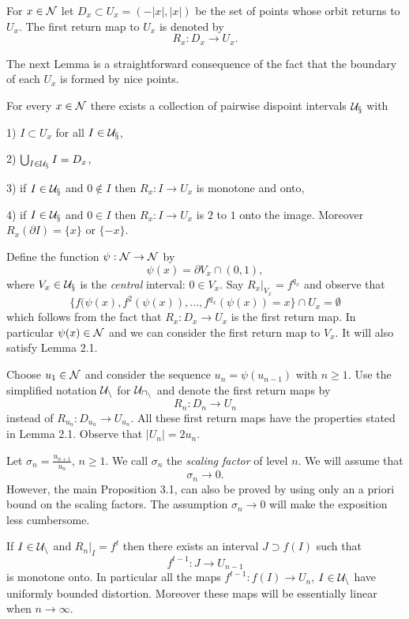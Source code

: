 \flushpar
For $x\in \Cal{N}$ let $D_x\subset U_x=(-|x|,|x|)$ 
be the set of points whose orbit returns to $U_x$. The first return map to 
$U_x$ is denoted by 
$$
R_x:D_x\to U_x.
$$

\flushpar
The next Lemma is a straightforward consequence of
the fact that 
the boundary of each $U_x$ is formed by  nice points.

 For every $x\in \Cal{N}$ there exists a collection of
pairwise dispoint intervals $\Cal{U}_x$ with
\parindent=15pt
\item{1)} $I\subset U_x$ for all $I\in \Cal{U}_x$,
\item{2)} $\bigcup_{I\in \Cal{U}_x} I =D_x$,
\item{3)} if $I\in \Cal{U}_x$ and $0\notin I$ then
$R_x:I\to U_x$  
is monotone and onto,
\item{4)} if $I\in \Cal{U}_x$ and $0\in I$ then 
$
R_x:I\to U_x
$
is $2$ to $1$ onto the image. Moreover $R_x(\partial I)= \{x\} 
\text{ or } \{-x\}$.
\endproclaim

\flushpar
Define the function $\psi:\Cal{N}\to\Cal{N}$ by
$$
\psi(x)=\partial V_x\cap(0,1),
$$
where $V_x\in \Cal{U}_x$ is the {\it central} interval: $0\in V_x$. Say
$R_x|_{V_x}=f^{q_x}$ and observe that
$$
\{f(\psi(x), f^2(\psi(x)), \dots, f^{q_x}(\psi(x))=x\}\cap U_x=\emptyset
$$
which follows from the fact that $R_x:D_x\to U_x$ is the first return map.
In particular $\psi(x)\in \Cal{N}$ and we can consider the 
first return map to $V_x$. It will also satisfy Lemma 2.1.

\flushpar
Choose $u_1\in \Cal{N}$
and consider the sequence $u_{n}=\psi(u_{n-1})$ with $n\ge 1$. Use the 
simplified notation $\Cal{U}_n$ for $\Cal{U}_{u_n}$ and denote the first
return maps by
$$
R_n:D_n\to U_n
$$
instead of $R_{u_n}:D_{u_n}\to U_{u_n}$. All these first return maps 
have the  properties stated in Lemma 2.1. Observe that $|U_n|=2u_n$. 

\bigskip

\flushpar
Let $\sigma_n=\frac{u_{n+1}}{u_n}$, $n\ge 1$. We call $\sigma_n$ the 
{\it scaling factor} of level $n$. We will assume that
$$
\sigma_n\to 0.
$$
However, the main Proposition 3.1, can also be proved by using only an 
a priori bound on the scaling factors. The assumption $\sigma_n\to 0$ will
make the exposition less cumbersome.

If $I\in \Cal{U}_n$ and $R_n|_I=f^t$ then there exists an interval 
$J\supset f(I)$ such that 
$$
f^{t-1}:J\to U_{n-1}
$$ 
is monotone onto. In particular all the maps $f^{t-1}: f(I) \to U_n$, 
$I\in \Cal{U}_n$ have uniformly bounded distortion. Moreover these maps will
be essentially linear when $n\to \infty$. 
\endproclaim

